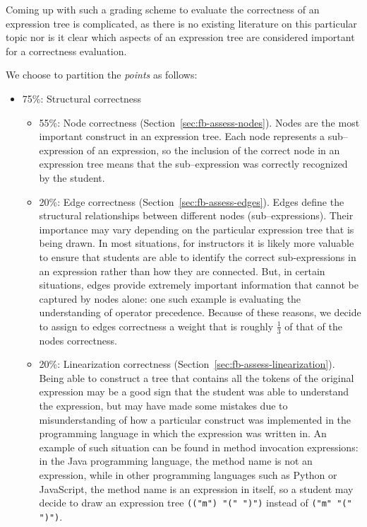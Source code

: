 \begin{chapterBody}
Coming up with such a grading scheme to evaluate the correctness of an
expression tree is complicated, as there is no existing literature on this
particular topic nor is it clear which aspects of an expression tree are
considered important for a correctness evaluation.

We choose to partition the \textit{points} as follows:

\begin{itemize}
    \item 75\%: Structural correctness
    \begin{itemize}
        \item 55\%: Node correctness (Section~\ref{sec:fb-assess-nodes}). Nodes
are the most important construct in an expression tree. Each node represents
a sub–expression of an expression, so the inclusion of the correct node in
an expression tree means that the sub–expression was correctly recognized by
the student.
        \item 20\%: Edge correctness (Section~\ref{sec:fb-assess-edges}).
Edges define the structural relationships between different nodes
(sub–expressions). Their importance may vary depending on the particular
expression tree that is being drawn.
In most situations, for instructors it is likely more valuable to ensure that
students are able to identify the correct sub-expressions in an expression
rather than how they are connected. But, in certain situations, edges provide
extremely important information that cannot be captured by nodes alone:
one such example is evaluating the understanding of operator precedence.
Because of these reasons, we decide to assign to edges correctness a weight
that is roughly $ \frac{1}{3} $ of that of the nodes correctness.
        \item 20\%: Linearization correctness
(Section~\ref{sec:fb-assess-linearization}). Being able to construct a tree that
contains all the tokens of the original expression may be a good sign that the
student was able to understand the expression, but may have made some mistakes
due to misunderstanding of how a particular construct was implemented in the
programming language in which the expression was written in. An example of
such situation can be found in method invocation expressions: in the Java
programming language, the method name is not an expression, while in other
programming languages such as Python or JavaScript, the method name is an
expression in itself, so a student may decide to draw an expression tree
\lstinline[language=etl]{(("m") "(" ")")} instead of
\lstinline[language=etl]{("m" "(" ")")}.

\end{itemize}
\end{itemize}
\end{chapterBody}
